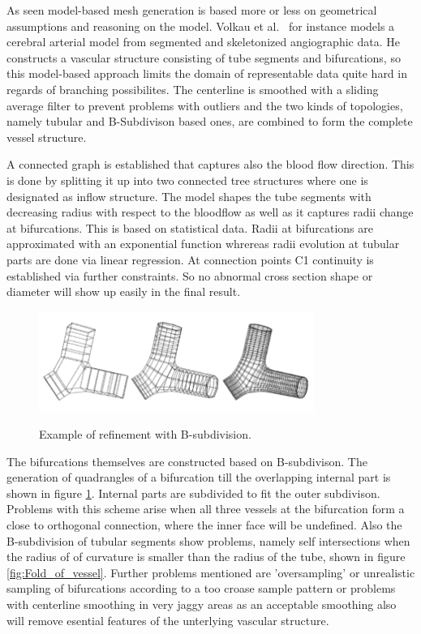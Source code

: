 As seen model-based mesh generation is based more or less on geometrical assumptions and reasoning on the model.
Volkau et al.~\cite{volkau2005geometric} for instance models a cerebral arterial model from segmented and skeletonized angiographic data. He constructs a vascular structure consisting of tube segments and bifurcations, so this model-based approach limits the domain of representable data quite hard in regards of branching possibilites. The centerline is smoothed with a sliding average filter to prevent problems with outliers and the two kinds of topologies, namely tubular and B-Subdivison based ones, are combined to form the complete vessel structure.

A connected graph is established that captures also the blood flow direction. This is done by splitting it up into two connected tree structures where one is designated as inflow structure. The model shapes the tube segments with decreasing radius with respect to the bloodflow as well as it captures radii change at bifurcations. This is based on statistical data. Radii at bifurcations are approximated with an exponential function whrereas radii evolution at tubular parts are done via linear regression. At connection points C1 continuity is established via further constraints. So no abnormal cross section shape or diameter will show up easily in the final result.

\begin{figure}[h]
	\centering
	\includegraphics[width=0.8\textwidth]{./Images/B-subdivision_refinement.png} \\
	\caption{Example of refinement with B-subdivision.}
	\label{fig:B-subdivision_refinement}
\end{figure}

The bifurcations themselves are constructed based on B-subdivison. The generation of quadrangles of a bifurcation till the overlapping internal part is shown in figure \ref{fig:B-subdivision_refinement}. Internal parts are subdivided to fit the outer subdivison. Problems with this scheme arise when all three vessels at the bifurcation form a close to orthogonal connection, where the inner face will be undefined. Also the B-subdivision of tubular segments show problems, namely self intersections when the radius of of curvature is smaller than the radius of the tube, shown in figure \ref{fig:Fold_of_vessel}.
Further problems mentioned are 'oversampling' or unrealistic sampling of bifurcations according to a too croase sample pattern or problems with centerline smoothing in very jaggy areas as an acceptable smoothing also will remove esential features of the unterlying vascular structure.  

